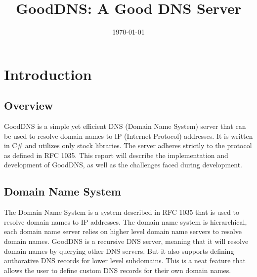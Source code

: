 \documentclass[12pt]{article}
\title{GoodDNS: A Good DNS Server}
\date{\today}
\begin{document}
\subsectionfont{\fontsize{12}{14}\selectfont}

\maketitle

\tableofcontents

\section{Introduction}

\subsection{Overview}
GoodDNS is a simple yet efficient DNS\cite{DomainNamesImplementation1987} (Domain Name System) server that can be used to resolve domain names to IP\cite{InternetProtocol1981} (Internet Protocol) addresses. It is written in C\# and utilizes only stock libraries.
The server adheres strictly to the protocol as defined in RFC 1035\cite{DomainNamesImplementation1987}. This report will describe the implementation and
development of GoodDNS, as well as the challenges faced during development.

\subsection{Domain Name System}
The Domain Name System\cite{DomainNamesImplementation1987} is a system described in RFC 1035\cite{DomainNamesImplementation1987} 
that is used to resolve domain names to IP addresses. The domain name system is hierarchical, each domain name server relies on higher level domain name servers to resolve domain names.
GoodDNS is a recursive DNS server, meaning that it will resolve domain names by querying other DNS servers. But it also supports defining authorative DNS records for lower level subdomains.
This is a neat feature that allows the user to define custom DNS records for their own domain names.
\end{document}
